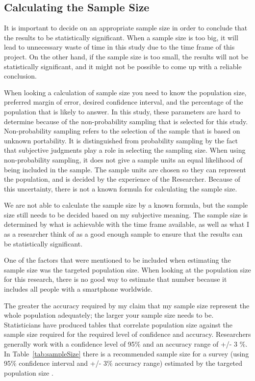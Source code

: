     \subsection{Calculating the Sample Size} \label{sec:samplesize}

    It is important to decide on an appropriate sample size in order to conclude that the results to be statistically significant. When a sample size is too big, it will lead to unnecessary waste of time in this study due to the time frame of this project. On the other hand, if the sample size is too small, the results will not be statistically significant, and it might not be possible to come up with a reliable conclusion.

    When looking a calculation of sample size you need to know the population size, preferred margin of error, desired confidence interval, and the percentage of the population that is likely to answer. In this study, these parameters are hard to determine because of the non-probability sampling that is selected for this study. Non-probability sampling refers to the selection of the sample that is based on unknown portability. It is distinguished from probability sampling by the fact that subjective judgments play a role in selecting the sampling size. When using non-probability sampling, it does not give a sample units an equal likelihood of being included in the sample. The sample units are chosen so they can represent the population, and is decided by the experience of the Researcher. Because of this uncertainty, there is not a known formula for calculating the sample size.

    We are not able to calculate the sample size by a known formula, but the sample size still needs to be decided based on my subjective meaning. The sample size is determined by what is achievable with the time frame available, as well as what I as a researcher think of as a good enough sample to ensure that the results can be statistically significant.

    One of the factors that were mentioned to be included when estimating the sample size was the targeted population size. When looking at the population size for this research, there is no good way to estimate that number because it includes all people with a smartphone worldwide.

    The greater the accuracy required by my claim that my sample size represent the whole population adequately; the larger your sample size needs to be. Statisticians have produced tables that correlate population size against the sample size required for the required level of confidence and accuracy. Researchers generally work with a confidence level of 95\% and an accuracy range of +/- 3 \%. In Table~\ref{tab:sampleSize} there is a recommended sample size for a survey (using 95\% confidence interval and +/- 3\% accuracy range) estimated by the targeted population size \cite{empiriske}.

